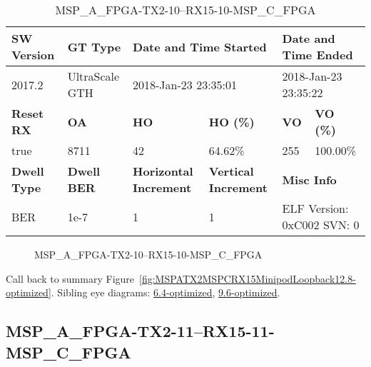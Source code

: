 \begin{table}[h]
\centering
\caption{MSP\_A\_FPGA-TX2-10--RX15-10-MSP\_C\_FPGA}
\label{tab:MSPAFPGATX210RX1510MSPCFPGA12.8-optimized}
\begin{tabular}{@{}|l|l|l|l|l|l|@{}}
\toprule
\textbf{SW Version}                & \textbf{GT Type}   & \multicolumn{2}{l|}{\textbf{Date and Time Started}}            & \multicolumn{2}{l|}{\textbf{Date and Time Ended}}        \\ \midrule
2017.2                       & UltraScale GTH          & \multicolumn{2}{l|}{2018-Jan-23 23:35:01}                   & \multicolumn{2}{l|}{2018-Jan-23 23:35:22}               \\ \midrule
\textbf{Reset RX}                  & \textbf{OA} & \textbf{HO}   & \textbf{HO (\%)} & \textbf{VO} & \textbf{VO (\%)} \\ \midrule
true & 8711        & 42          & 64.62\%        & 255        & 100.00\%       \\ \midrule
\textbf{Dwell Type}                & \textbf{Dwell BER} & \textbf{Horizontal Increment} & \textbf{Vertical Increment}    & \multicolumn{2}{l|}{\textbf{Misc Info}}                  \\ \midrule
BER                            & 1e-7        & 1        & 1           & \multicolumn{2}{l|}{ELF Version: 0xC002 SVN: 0}                         \\ \bottomrule
\end{tabular}
\end{table}

\begin{figure}[h]
\caption{MSP\_A\_FPGA-TX2-10--RX15-10-MSP\_C\_FPGA} \label{fig:MSPAFPGATX210RX1510MSPCFPGA12.8-optimized}
\end{figure}

Call back to summary Figure~\ref{fig:MSPATX2MSPCRX15MinipodLoopback12.8-optimized}.
Sibling eye diagrams: \hyperref[sec:MSPAFPGATX210RX1510MSPCFPGA6.4-optimized]{6.4-optimized}, \hyperref[sec:MSPAFPGATX210RX1510MSPCFPGA9.6-optimized]{9.6-optimized}.

\clearpage
\newpage


\subsection{MSP\_A\_FPGA-TX2-11--RX15-11-MSP\_C\_FPGA}\label{sec:MSPAFPGATX211RX1511MSPCFPGA12.8-optimized}

